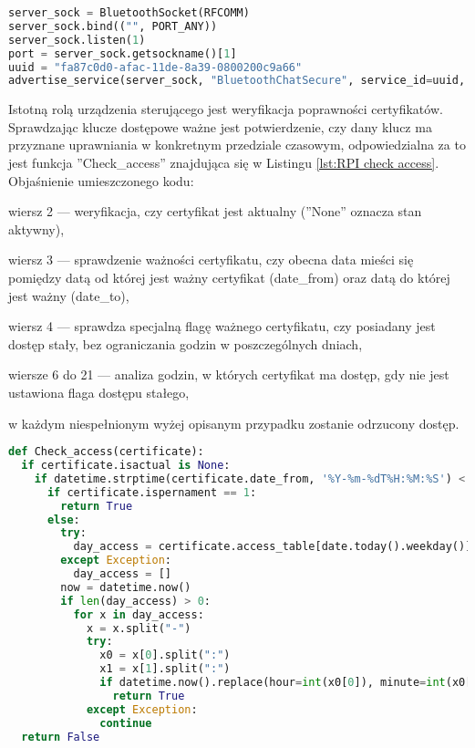 {\footnotesize 
\begin{lstlisting}[caption={Tworzenie serwera bluetooth}, label={lst:RPI bt}, language=Python]
server_sock = BluetoothSocket(RFCOMM)
server_sock.bind(("", PORT_ANY))
server_sock.listen(1)
port = server_sock.getsockname()[1]
uuid = "fa87c0d0-afac-11de-8a39-0800200c9a66"
advertise_service(server_sock, "BluetoothChatSecure", service_id=uuid, service_classes=[uuid, SERIAL_PORT_CLASS], profiles=[SERIAL_PORT_PROFILE])
\end{lstlisting}}
Istotną rolą urządzenia sterującego jest weryfikacja poprawności certyfikatów. Sprawdzając klucze dostępowe ważne jest potwierdzenie, czy dany klucz ma przyznane uprawniania w konkretnym przedziale czasowym, odpowiedzialna za to jest funkcja ''Check\_access'' znajdująca się w Listingu \ref{lst:RPI check access}. Objaśnienie umieszczonego kodu:
\begin{itemize*}
	\item wiersz 2 --- weryfikacja, czy certyfikat jest aktualny (''None'' oznacza stan aktywny),
	\item wiersz 3 --- sprawdzenie ważności certyfikatu, czy obecna data mieści się pomiędzy datą od której jest ważny certyfikat (date\_from) oraz datą do której jest ważny (date\_to),
	\item  wiersz 4 --- sprawdza specjalną flagę ważnego certyfikatu, czy posiadany jest dostęp stały, bez ograniczania godzin w poszczególnych dniach,
	\item wiersze 6 do 21 --- analiza godzin, w których certyfikat ma dostęp, gdy nie jest ustawiona flaga dostępu stałego,
	\item w każdym niespełnionym wyżej opisanym przypadku zostanie odrzucony dostęp.
\end{itemize*}

{\footnotesize 
	\begin{lstlisting}[caption={Funkcja Check-access urządzenia sterującego}, label={lst:RPI check access}, language=Python]
def Check_access(certificate):
  if certificate.isactual is None:
    if datetime.strptime(certificate.date_from, '%Y-%m-%dT%H:%M:%S') < datetime.now() < datetime.strptime( certificate.date_to, '%Y-%m-%dT%H:%M:%S'):
      if certificate.ispernament == 1:
        return True
      else:
        try:
          day_access = certificate.access_table[date.today().weekday()].split(";")
        except Exception:
          day_access = []
        now = datetime.now()
        if len(day_access) > 0:
          for x in day_access:
            x = x.split("-")
            try:
              x0 = x[0].split(":")
              x1 = x[1].split(":")
              if datetime.now().replace(hour=int(x0[0]), minute=int(x0[1])) <= now < datetime.now().replace(hour=int(x1[0]), minute=int(x1[1])):
                return True
            except Exception:
              continue
  return False
	\end{lstlisting}}
\newpage
